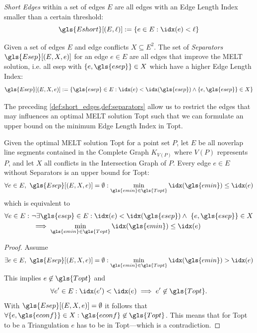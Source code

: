 \begin{definition}
  \label{def:short_edges}
  \emph{Short Edges} within a set of edges \(E\) are all edges with an
  Edge Length Index smaller than a certain threshold:
  \[
    \gls{Eshort}[(E, \ell)] := \{ e \in E : \idx(e) < \ell \}
  \]
\end{definition}
\vspace*{-1.5em}
\begin{definition}[Separators]
  \label{def:separators}
  Given a set of edges \(E\) and edge conflicts \(X \subseteq E^2\). 
  The set of \emph{Separators} \(\gls{Esep}[(E, X, e)]\) 
  for an edge \(e \in E\) are all edges
  that improve the \gls{MELT} solution, i.e. all \gls{esep} with
  \(\{e,\gls{esep}\} \in X\) which have a higher Edge Length Index:
  \[
	  \gls{Esep}[(E,X,e)] := \{
		  \gls{esep} \in E:
		  \idx(e) < \idx(\gls{esep}) \land \{e,\gls{esep}\} \in X
	  \}
  \]
\end{definition}

The preceding \cref{def:short_edges,def:separators} allow us to
restrict the edges that may influences an optimal \gls{MELT} solution
\gls{Topt} such that we can formulate an upper bound on the minimum
Edge Length Index in \gls{Topt}.

\begin{theorem}
  \label{thm:upper_bound}
  Given the optimal \gls{MELT} solution \gls{Topt}
  for a point set \(P\), let \(E\) be all \gls{noverlap} line segments
  contained in the Complete Graph \(K_{V(P)}\)
  where \(V(P)\) represents \(P\),
  and let \(X\) all conflicts in the Intersection Graph of \(P\).
  Every edge \(e \in E\) without Separators
  is an upper bound for \gls{Topt}:
  \[
    \forall e \in E,~ \gls{Esep}[(E,X,e)] = \emptyset :
    \min\limits_{\gls{emin} \in \gls{Topt}}
    \idx(\gls{emin}) \leq \idx(e)
  \]
  which is equivalent to
  \begin{alignat*}{1}
    \forall e \in E:~ 
    &\lnot\exists \gls{esep} \in E:
    \idx(e) < \idx(\gls{esep})
    \land~ \{e, \gls{esep}\} \in X \\
    &\implies \min\limits_{\gls{emin} \in \gls{Topt}}
    \idx(\gls{emin}) \leq \idx(e)
  \end{alignat*}
  \begin{proof}
  Assume
  \[
    \exists e \in E,~ \gls{Esep}[(E,X,e)] = \emptyset :
    \min\limits_{\gls{emin} \in \gls{Topt}}
    \idx(\gls{emin}) > \idx(e)
  \]
  This implies \(e \not\in \gls{Topt}\) and
  \[
    \forall e' \in E:
    \idx(e') < \idx(e)
    \implies e' \not\in \gls{Topt}.
  \]
  With \(\gls{Esep}[(E,X,e)] = \emptyset\) it follows that
  \(
    \forall \{e, \gls{econf}\} \in X :
    \gls{econf} \not\in \gls{Topt}
  \).
  This means that for \gls{Topt} to be a Triangulation
  \(e\) has to be in \gls{Topt}---which is a contradiction.
  \end{proof}
\end{theorem}

